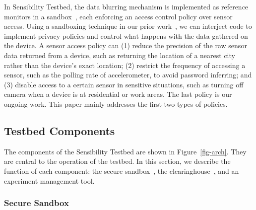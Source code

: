 In Sensibility Testbed, the data blurring 
mechanism is implemented as reference monitors in a 
sandbox~\cite{ref}, each enforcing an access control 
policy over sensor access. Using a sandboxing 
technique in our prior work~\cite{cappos2010retaining}, we can 
interject code to implement privacy policies and control what 
happens with the data gathered on the device. A sensor access 
policy can (1) reduce 
the precision of the raw sensor data returned from a device, such
as returning the location of a nearest city rather than the device's exact location; (2) restrict 
the frequency of accessing a sensor, such as the polling rate of 
accelerometer, to avoid password inferring; and (3) disable  
access to a certain sensor in sensitive situations, such as 
turning off camera when a device is at residential or work areas.
The last policy is our ongoing work. This paper mainly addresses
the first two types of policies. 

\subsection{Testbed Components}\label{sec-component}

The components of the Sensibility Testbed are shown in Figure~\ref{fig-arch}.
They are central to the operation of the testbed. 
In this section, we describe the function of each component: the
secure sandbox~\cite{cappos2010retaining}, the clearinghouse~\cite{ch}, 
and an experiment management tool.

\subsubsection{Secure Sandbox}\label{sec-repy}

